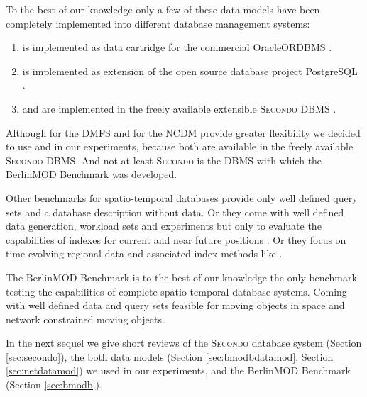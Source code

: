 \documentclass[a4paper]{article}
\newcommand{\secondo}{\textsc{Secondo}}
\newcommand{\bmodb} {BerlinMOD Benchmark}
\begin{document}
To the best of our knowledge only a few of these data models have been completely
implemented into different database management systems:
\begin{enumerate}
  \item \cite{STAUPelekis} is implemented as data cartridge \cite{HERMESMDCPelekis,
HERMESPelekis} for the commercial Oracle\textregistered ORDBMS \cite{ORACLE}.
  \item \cite{DynamicTransportNetworkDing} is implemented as extension of the
open source database project PostgreSQL \cite{PostgreSQL}.
  \item \cite{RepresentingMovingObjectsGueting,DataModelDataStructureGueting}
and \cite{NetworkGueting} are implemented in the freely available extensible
\secondo{} DBMS \cite{SecondoPlatformPrototypingGueting}.
\end{enumerate}

Although \cite{STAUPelekis} for the DMFS and \cite{DynamicTransportNetworkDing} for
the NCDM provide greater flexibility we decided to use
\cite{RepresentingMovingObjectsGueting,DataModelDataStructureGueting}
and \cite{NetworkGueting} in our experiments, because both are available in the
freely available \secondo{} DBMS. And not at least \secondo{} is the DBMS with
which the \bmodb{} \cite{BerlinMODVLDBDuentgen} was developed.

Other benchmarks for spatio-temporal databases provide only well defined
query sets \cite{QueriesTheordoridis} and a database description without data.
Or they come with well defined data generation, workload sets and experiments but
only to evaluate the capabilities of indexes for current and near future positions
\cite{COSTBenchmarkJensen}. Or they focus on time-evolving regional data and associated
index methods like \cite{BenchmarkTzouramanis}.

The \bmodb{} is to the best of our knowledge the only benchmark testing the capabilities
of complete spatio-temporal database systems. Coming with well defined data and
query sets feasible for moving objects in space and network constrained moving objects.

In the next sequel we give short reviews of the \secondo{} database system
(Section \ref{sec:secondo}), the both data models (Section \ref{sec:bmodbdatamod},
Section \ref{sec:netdatamod}) we used in our experiments, and the \bmodb{}
(Section \ref{sec:bmodb}).
\end{document}

